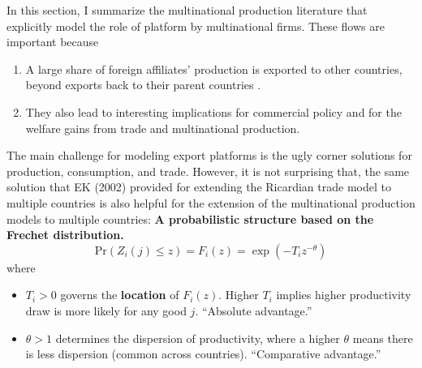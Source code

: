 In this section, I summarize the multinational production literature that 
explicitly model the role of platform by multinational firms.%
These flows are important because 
\begin{enumerate}
    \item A large share of foreign affiliates' production is exported to other countries, beyond exports back to their parent countries \citep{Tintelnot:2017}.
    \item They also lead to interesting implications for commercial policy and for the welfare gains from trade and multinational production.
\end{enumerate}

The main challenge for modeling export platforms is the ugly corner solutions for production, consumption, and trade.
However, it is not surprising that,
the same solution that EK (2002) provided for extending the Ricardian trade model to multiple countries is 
also helpful for the extension of the multinational production models to multiple countries:
\textbf{A probabilistic structure based on the Frechet distribution.}
\begin{equation}
    \text{Pr}( Z_i(j) \leq z) = F_i(z) = \exp(-T_i z^{-\theta})
\end{equation}
where 
\begin{itemize}
    \item $T_i > 0$ governs the \textbf{location} of $F_i(z)$. 
Higher $T_i$ implies higher productivity draw is more likely for any good $j$. ``Absolute advantage.''
    \item $\theta > 1$ determines the dispersion of productivity, where a higher $\theta$ means there is less dispersion (common across countries).
``Comparative advantage.''
\end{itemize}